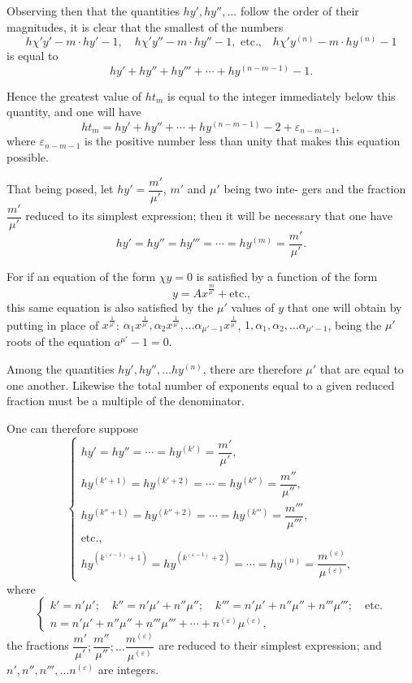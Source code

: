 \documentclass{article}
\begin{document}
Observing then that the quantities $hy', hy'', \ldots$ follow the order of their magnitudes, it is clear that the smallest of the numbers
\[ h\chi' y' - m \cdot hy' - 1, \quad h\chi' y'' - m \cdot hy'' - 1, \text{ etc.,} \quad h\chi' y^{(n)} - m \cdot hy^{(n)} - 1 \]
is equal to
\[ hy' + hy'' + hy''' + \cdots + hy^{(n-m-1)} - 1. \]

Hence the greatest value of $ht_m$ is equal to the integer immediately below this quantity, and one will have
\[ ht_m = hy' + hy'' + \cdots + hy^{(n-m-1)} - 2 + \varepsilon_{n-m-1}, \tag{53} \]
where $\varepsilon_{n-m-1}$ is the positive number less than unity that makes this equation possible.

That being posed, let $hy' = \dfrac{m'}{\mu'}$, $m'$ and $\mu'$ being two inte-
gers and the fraction $\dfrac{m'}{\mu'}$ reduced to its simplest expression; then it will be necessary that one have
\[ hy' = hy'' = hy''' = \cdots = hy^{(m)} = \frac{m'}{\mu'}. \]

For if an equation of the form $\chi y = 0$ is satisfied by a function of the form
\[ y = A x^{\frac{m}{\mu'}} + \text{etc.,} \]
this same equation is also satisfied by the $\mu'$ values of $y$ that one will obtain by putting in place of $x^{\frac{1}{\mu'}}$: $\alpha_1 x^{\frac{1}{\mu'}}, \alpha_2 x^{\frac{1}{\mu'}}, \ldots \alpha_{\mu'-1} x^{\frac{1}{\mu'}}$, $1, \alpha_1, \alpha_2, \ldots \alpha_{\mu'-1}$, being the $\mu'$ roots of the equation $a^{\mu'} - 1 = 0$.

Among the quantities $hy', hy'', \ldots hy^{(n)}$, there are therefore $\mu'$ that are equal to one another. Likewise the total number of exponents equal to a given reduced fraction must be a multiple of the denominator.

One can therefore suppose
\[ \begin{cases}
hy' = hy'' = \cdots = hy^{(k')} = \dfrac{m'}{\mu'}, \\
hy^{(k'+1)} = hy^{(k'+2)} = \cdots = hy^{(k'')} = \dfrac{m''}{\mu''}, \\
hy^{(k''+1)} = hy^{(k''+2)} = \cdots = hy^{(k''')} = \dfrac{m'''}{\mu'''}, \\
\text{etc.,} \\
hy^{(k^{(\varepsilon-1)}+1)} = hy^{(k^{(\varepsilon-1)}+2)} = \cdots = hy^{(n)} = \dfrac{m^{(\varepsilon)}}{\mu^{(\varepsilon)}},
\end{cases} \tag{54} \]
where
\[ \begin{cases} k' = n'\mu'; \quad k'' = n'\mu' + n''\mu''; \quad k''' = n'\mu' + n''\mu'' + n'''\mu'''; \quad \text{etc.} \\ n = n'\mu' + n''\mu'' + n'''\mu''' + \cdots + n^{(\varepsilon)}\mu^{(\varepsilon)}, \end{cases} \tag{55} \]
the fractions $\dfrac{m'}{\mu'}; \dfrac{m''}{\mu''}; \ldots \dfrac{m^{(\varepsilon)}}{\mu^{(\varepsilon)}}$ are reduced to their simplest expression; and $n', n'', n''', \ldots n^{(\varepsilon)}$ are integers.
\end{document}
